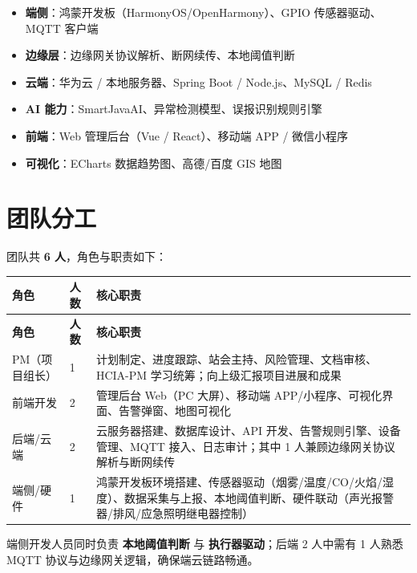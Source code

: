 \documentclass[UTF8,12pt,a4paper]{ctexart}
\begin{document}
\begin{tcolorbox}[colback=lightgray,colframe=gray!50,arc=2mm,boxrule=0.5pt,title={\textbf{技术栈概览}}]
\begin{itemize}
  \item \textbf{端侧}：鸿蒙开发板（HarmonyOS/OpenHarmony）、GPIO 传感器驱动、MQTT 客户端
  \item \textbf{边缘层}：边缘网关协议解析、断网续传、本地阈值判断
  \item \textbf{云端}：华为云 / 本地服务器、Spring Boot / Node.js、MySQL / Redis
  \item \textbf{AI 能力}：SmartJavaAI、异常检测模型、误报识别规则引擎
  \item \textbf{前端}：Web 管理后台（Vue / React）、移动端 APP / 微信小程序
  \item \textbf{可视化}：ECharts 数据趋势图、高德/百度 GIS 地图
\end{itemize}
\end{tcolorbox}

\section{团队分工}

团队共 \textbf{6 人}，角色与职责如下：

\begin{longtable}{C{2.2cm}C{1.8cm}L{8.5cm}}
\toprule
\textbf{角色} & \textbf{人数} & \textbf{核心职责} \\
\midrule
\endfirsthead
\toprule
\textbf{角色} & \textbf{人数} & \textbf{核心职责} \\
\midrule
\endhead
\bottomrule
\endfoot

PM（项目组长） & 1 & 计划制定、进度跟踪、站会主持、风险管理、文档审核、HCIA-PM 学习统筹；向上级汇报项目进展和成果 \\
\midrule
前端开发 & 2 & 管理后台 Web（PC 大屏）、移动端 APP/小程序、可视化界面、告警弹窗、地图可视化 \\
\midrule
后端/云端 & 2 & 云服务器搭建、数据库设计、API 开发、告警规则引擎、设备管理、MQTT 接入、日志审计；其中 1 人兼顾边缘网关协议解析与断网续传 \\
\midrule
端侧/硬件 & 1 & 鸿蒙开发板环境搭建、传感器驱动（烟雾/温度/CO/火焰/湿度）、数据采集与上报、本地阈值判断、硬件联动（声光报警器/排风/应急照明继电器控制） \\
\bottomrule
\end{longtable}

\begin{tcolorbox}[colback=lightorange,colframe=warnorange,arc=2mm,boxrule=0.8pt,title={\faExclamationTriangle\ 注意事项}]
端侧开发人员同时负责 \textbf{本地阈值判断} 与 \textbf{执行器驱动}；后端 2 人中需有 1 人熟悉 MQTT 协议与边缘网关逻辑，确保端云链路畅通。
\end{tcolorbox}
\end{document}
